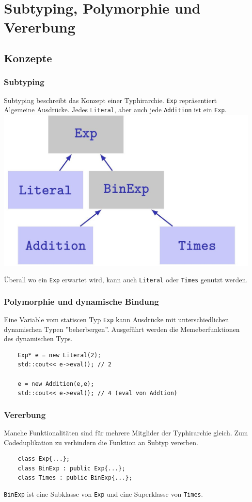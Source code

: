 \section{Subtyping, Polymorphie und Vererbung}
\subsection{Konzepte}
\subsubsection{Subtyping}
\begin{multicols}{2}
	Subtyping beschreibt das Konzept einer Typhirarchie. \texttt{Exp} repräsentiert Algemeine Ausdrücke. Jedes \texttt{Literal}, aber auch jede \texttt{Addition} ist ein \texttt{Exp}.\\ \includegraphics[width=0.12 \textwidth]{sections/subtyping}
\end{multicols}
Überall wo ein \texttt{Exp} erwartet wird, kann auch \texttt{Literal} oder \texttt{Times} genutzt werden.
\subsubsection{Polymorphie und dynamische Bindung}
Eine Variable vom statiscen Typ \texttt{Exp} kann Ausdrücke mit unterschiedlichen dynamischen Typen ''beherbergen''. Ausgeführt werden die Memeberfunktionen des dynamischen Typs.
\begin{lstlisting}
	Exp* e = new Literal(2);
	std::cout<< e->eval(); // 2
	
	e = new Addition(e,e);
	std::cout<< e->eval(); // 4 (eval von Addtion)
\end{lstlisting}
\subsubsection{Vererbung}
Manche Funktionalitäten sind für mehrere Mitglider der Typhirarchie gleich. Zum Codeduplikation zu verhindern die Funktion an Subtyp vererben.
\begin{lstlisting}
	class Exp{...};
	class BinExp : public Exp{...};
	class Times : public BinExp{...};
\end{lstlisting}
\texttt{BinExp} ist eine Subklasse von \texttt{Exp} und eine Superklasse von \texttt{Times}.
